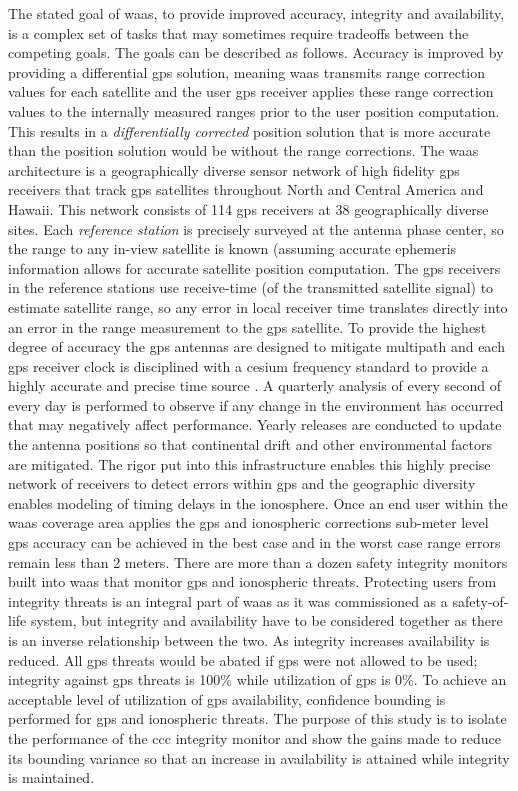 The stated goal of \ac{waas}, to provide improved accuracy, integrity and availability, is a complex set of tasks that may sometimes require tradeoffs between the competing goals.  The goals can be described as follows.  Accuracy is improved by providing a differential \ac{gps} solution, meaning \ac{waas} transmits range correction values for each satellite and the user \ac{gps} receiver applies these range correction values to the internally measured ranges prior to the user position computation.  This results in a \emph{differentially corrected} position solution that is more accurate than the position solution would be without the range corrections. The \ac{waas} architecture is a geographically diverse sensor network of high fidelity \ac{gps} receivers that track \ac{gps} satellites throughout North and Central America and Hawaii. This network consists of 114 \ac{gps} receivers at 38 geographically diverse sites.  Each \emph{reference station} is precisely surveyed at the antenna phase center, so the range to any in-view satellite is known (assuming accurate ephemeris information allows for accurate satellite position computation. The \ac{gps} receivers in the reference stations use receive-time (of the transmitted satellite signal) to estimate satellite range, so any error in local receiver time translates directly into an error in the range measurement to the \ac{gps} satellite. To provide the highest degree of accuracy the \ac{gps} antennas are designed to mitigate multipath and each \ac{gps} receiver clock is disciplined with a cesium frequency standard to provide a highly accurate and precise time source \citep[]{Kerkhoff}. A quarterly analysis of every second of every day is performed to observe if any change in the environment has occurred that may negatively affect performance. Yearly releases are conducted to update the antenna positions so that continental drift and other environmental factors are mitigated. The rigor put into this infrastructure enables this highly precise network of receivers to detect errors within \ac{gps} and the geographic diversity enables modeling of timing delays in the ionosphere. Once an end user within the \ac{waas} coverage area applies the \ac{gps} and ionospheric corrections sub-meter level \ac{gps} accuracy can be achieved in the best case and in the worst case range errors remain less than 2 meters. There are more than a dozen safety integrity monitors built into \ac{waas} that monitor \ac{gps} and ionospheric threats. Protecting users from integrity threats is an integral part of \ac{waas} as it was commissioned as a safety-of-life system, but integrity and availability have to be considered together as there is an inverse relationship between the two. As integrity increases availability is reduced. All \ac{gps} threats would be abated if \ac{gps} were not allowed to be used; integrity against \ac{gps} threats is 100\% while utilization of \ac{gps} is 0\%.  To achieve an acceptable level of utilization of \ac{gps} availability, confidence bounding is performed for \ac{gps} and ionospheric threats. The purpose of this study is to isolate the performance of the \ac{ccc} integrity monitor and show the gains made to reduce its bounding variance so that an increase in availability is attained while integrity is maintained. %